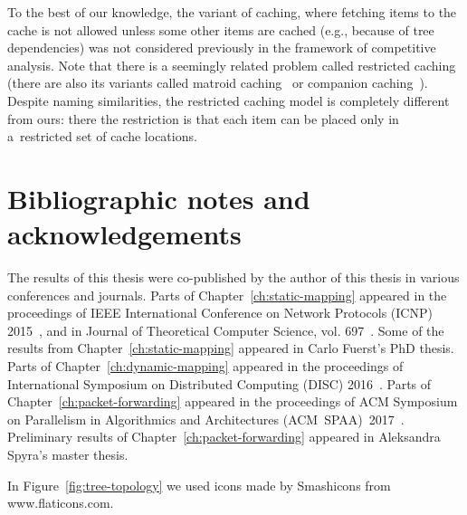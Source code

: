 To the best of our knowledge, the variant of caching, where fetching items to
the cache is not allowed unless some other items are cached (e.g., because of 
tree dependencies) was 
not considered previously in the framework of competitive analysis. Note that
there is a seemingly related problem called restricted
caching~\cite{restricted-caching} (there are also its variants called matroid
caching~\cite{matroid-caching} or companion caching~\cite{companion-caching}).
Despite naming similarities, the restricted caching model is completely
different from ours: there the restriction is that each item can be placed only in
a~restricted set of cache locations.


\section{Bibliographic notes and acknowledgements}

The results of this thesis were co-published by the author of this thesis in various conferences and journals.
Parts of Chapter~\ref{ch:static-mapping} appeared in the proceedings of IEEE International Conference on Network Protocols (ICNP) 2015~\cite{my-icnp},
and in Journal of Theoretical Computer Science, vol. 697~\cite{my-tcs}.
Some of the results from Chapter~\ref{ch:static-mapping} appeared in Carlo Fuerst's PhD thesis.
Parts of Chapter~\ref{ch:dynamic-mapping} appeared in the proceedings of International Symposium on Distributed Computing (DISC) 2016~\cite{my-disc}.
Parts of Chapter~\ref{ch:packet-forwarding} appeared in the proceedings of ACM Symposium on Parallelism in Algorithmics and Architectures (ACM~SPAA)~2017~\cite{my-spaa}.
Preliminary results of Chapter~\ref{ch:packet-forwarding} appeared in Aleksandra Spyra's master thesis.

In Figure~\ref{fig:tree-topology} we used icons made by Smashicons from www.flaticons.com.